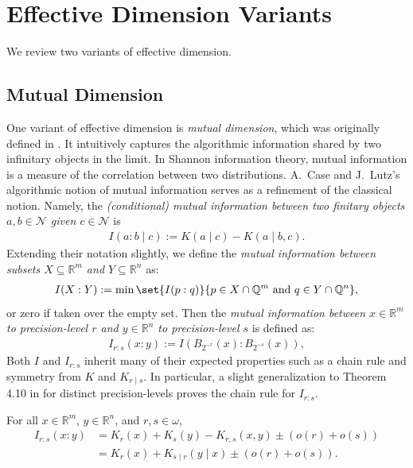 
\section{Effective Dimension Variants} \label{section:Conditional_and_Mutual_Dimensions}

We review two variants of effective dimension.

\subsection{Mutual Dimension}

One variant of effective dimension is \textit{mutual dimension}, which was originally defined in \cite{CL14}. It intuitively captures the algorithmic information shared by two infinitary objects in the limit. In Shannon information theory, mutual information is a measure of the correlation between two distributions. A.~Case and J.~Lutz's algorithmic notion of mutual information serves as a refinement of the classical notion. Namely, the \textit{(conditional) mutual information between two finitary objects $a, b \in \mathscr{N}$ given $c \in \mathscr{N}$} is
\begin{align*}
    I(a : b \mid c) := K(a \mid c) - K(a \mid b, c).
\end{align*}
Extending their notation slightly, we define the \textit{mutual information between subsets $X \subseteq \mathbb{R}^m$ and $Y \subseteq \mathbb{R}^n$} as:
\begin{align*}
    I(X : Y) := \min \set{I(p : q)}{p \in X \cap \mathbb{Q}^m \text{ and } q \in Y \cap \mathbb{Q}^n},
\end{align*}
or zero if taken over the empty set. Then the \textit{mutual information between $x \in \mathbb{R}^m$ to precision-level $r$ and $y \in \mathbb{R}^n$ to precision-level $s$} is defined as:
\begin{align*}
    I_{r : s}(x : y) := I(B_{2^{-r}}(x) : B_{2^{-s}}(x)),
\end{align*}
Both $I$ and $I_{r : s}$ inherit many of their expected properties such as a chain rule and symmetry from $K$ and $K_{r \mid s}$. In particular, a slight generalization to Theorem 4.10 in \cite{CL14} for distinct precision-levels proves the chain rule for $I_{r : s}$.
\begin{theorem}
    \label{theorem:chain_rule_mutual_information_r_s}
    For all $x \in \mathbb{R}^m$, $y \in \mathbb{R}^n$, and $r, s \in \omega$,
    \begin{align*}
        I_{r : s}(x : y) &= K_r(x) + K_s(y) - K_{r, s}(x, y) \pm (o(r) + o(s))\\
        &= K_r(x) + K_{s \mid r}(y \mid x) \pm (o(r) + o(s)).
    \end{align*}
\end{theorem}

